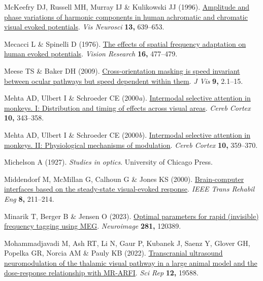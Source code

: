 \documentclass[
  letterpaper,
  DIV=11,
  numbers=noendperiod]{scrartcl}
\newlength{\cslhangindent}
\newenvironment{CSLReferences}[2] %
 {\begin{list}{}{%
  \setlength{\itemindent}{0pt}
  \setlength{\leftmargin}{0pt}
  \setlength{\parsep}{0pt}
  \ifodd #1
   \setlength{\leftmargin}{\cslhangindent}
   \setlength{\itemindent}{-1\cslhangindent}
  \fi
  \setlength{\itemsep}{#2\baselineskip}}}
 {\end{list}}
\begin{document}
\begin{CSLReferences}{1}{1}
McKeefry DJ, Russell MH, Murray IJ \& Kulikowski JJ (1996).
\href{https://doi.org/10.1017/s0952523800008543}{Amplitude and phase
variations of harmonic components in human achromatic and chromatic
visual evoked potentials}. \emph{Vis Neurosci} \textbf{13,} 639--653.

Mecacci L \& Spinelli D (1976).
\href{https://doi.org/10.1016/0042-6989(76)90025-0}{The effects of
spatial frequency adaptation on human evoked potentials}. \emph{Vision
Research} \textbf{16,} 477--479.

Meese TS \& Baker DH (2009).
\href{https://doi.org/10.1167/9.5.2}{Cross-orientation masking is speed
invariant between ocular pathways but speed dependent within them}.
\emph{J Vis} \textbf{9,} 2.1--15.

Mehta AD, Ulbert I \& Schroeder CE (2000\emph{a}).
\href{https://doi.org/10.1093/cercor/10.4.343}{Intermodal selective
attention in monkeys. I: Distribution and timing of effects across
visual areas}. \emph{Cereb Cortex} \textbf{10,} 343--358.

Mehta AD, Ulbert I \& Schroeder CE (2000\emph{b}).
\href{https://doi.org/10.1093/cercor/10.4.359}{Intermodal selective
attention in monkeys. II: Physiological mechanisms of modulation}.
\emph{Cereb Cortex} \textbf{10,} 359--370.

Michelson A (1927). \emph{Studies in optics}. University of Chicago
Press.

Middendorf M, McMillan G, Calhoun G \& Jones KS (2000).
\href{https://doi.org/10.1109/86.847819}{Brain-computer interfaces based
on the steady-state visual-evoked response}. \emph{IEEE Trans Rehabil
Eng} \textbf{8,} 211--214.

Minarik T, Berger B \& Jensen O (2023).
\href{https://doi.org/10.1016/j.neuroimage.2023.120389}{Optimal
parameters for rapid (invisible) frequency tagging using MEG}.
\emph{Neuroimage} \textbf{281,} 120389.

Mohammadjavadi M, Ash RT, Li N, Gaur P, Kubanek J, Saenz Y, Glover GH,
Popelka GR, Norcia AM \& Pauly KB (2022).
\href{https://doi.org/10.1038/s41598-022-20554-4}{Transcranial
ultrasound neuromodulation of the thalamic visual pathway in a large
animal model and the dose-response relationship with MR-ARFI}. \emph{Sci
Rep} \textbf{12,} 19588.


\end{CSLReferences}
\end{document}
